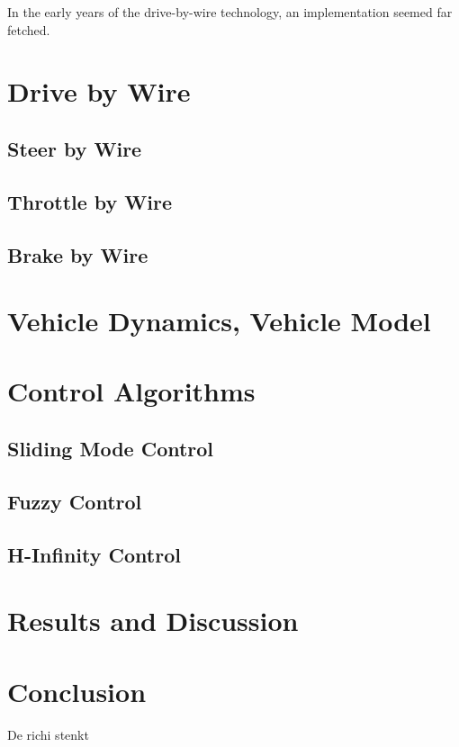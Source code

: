 \documentclass[conference]{IEEEtran}
\begin{document}
In the early years of the drive-by-wire technology, an implementation seemed far fetched.

\section{Drive by Wire}

\subsection{Steer by Wire}
\subsection{Throttle by Wire}
\subsection{Brake by Wire}
\section{Vehicle Dynamics, Vehicle Model}

\section{Control Algorithms}
\subsection{Sliding Mode Control}
\subsection{Fuzzy Control}
\subsection{H-Infinity Control}


\section{Results and Discussion}




\section{Conclusion}

De richi stenkt 
\end{document}
